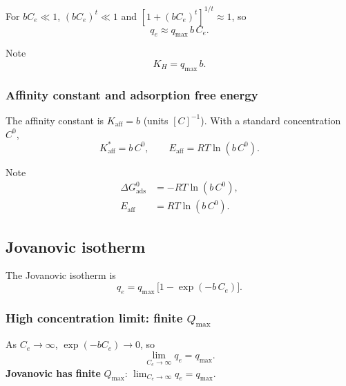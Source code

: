 \documentclass[journal=jacsat,manuscript=article]{achemso}
\begin{document}
For $bC_e \ll 1$, $(bC_e)^t \ll 1$ and $[1+(bC_e)^t]^{1/t} \approx 1$, so
\begin{equation}
	q_e \approx q_{\max}\, b\, C_e.
\end{equation}


\begin{bluebox}{Note}
	\begin{equation}
		K_H = q_{\max}\, b.
	\end{equation}
\end{bluebox}

\subsubsection{Affinity constant and adsorption free energy}

The affinity constant is $K_{\mathrm{aff}} = b$ (units $[C]^{-1}$). With a standard concentration $C^0$,
\begin{equation}
	K_{\mathrm{aff}}^{\ast} = b\, C^0,
	\qquad
	E_{\mathrm{aff}} = RT\ln(b\, C^0).
\end{equation}
\begin{bluebox}{Note}
	\begin{equation}
		\begin{aligned}
			\Delta G_{\mathrm{ads}}^{0} &= -RT\ln\!\left(b\, C^0\right),\\
			E_{\mathrm{aff}} &= RT\ln\!\left(b\, C^0\right).
		\end{aligned}
	\end{equation}
\end{bluebox}

\subsection{Jovanovic isotherm}
\label{sec:si_jovanovic}

The Jovanovic isotherm is
\begin{equation}
	q_e = q_{\max}\,\bigl[1 - \exp(-b\, C_e)\bigr].
	\label{eq:si_jovanovic}
\end{equation}

\subsubsection{High concentration limit: finite $Q_{\max}$}

As $C_e \to \infty$, $\exp(-bC_e) \to 0$, so
\begin{equation}
	\lim_{C_e \to \infty} q_e = q_{\max}.
\end{equation}
\textbf{Jovanovic has finite }$Q_{\max}$:\quad
$\displaystyle \lim_{C_e \to \infty} q_e = q_{\max}$.
\end{document}

